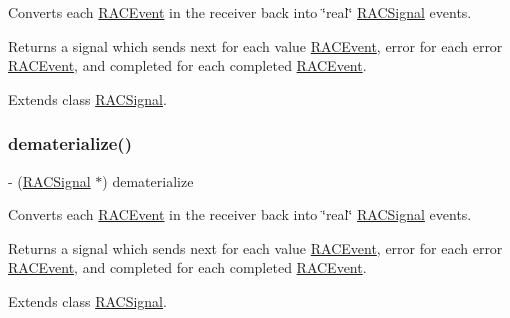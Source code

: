 Converts each \mbox{\hyperlink{interface_r_a_c_event}{R\+A\+C\+Event}} in the receiver back into \char`\"{}real\char`\"{} \mbox{\hyperlink{interface_r_a_c_signal}{R\+A\+C\+Signal}} events.

Returns a signal which sends {\ttfamily next} for each value \mbox{\hyperlink{interface_r_a_c_event}{R\+A\+C\+Event}}, {\ttfamily error} for each error \mbox{\hyperlink{interface_r_a_c_event}{R\+A\+C\+Event}}, and {\ttfamily completed} for each completed \mbox{\hyperlink{interface_r_a_c_event}{R\+A\+C\+Event}}. 

Extends class \mbox{\hyperlink{interface_r_a_c_signal_aa5b197f63d89c698c8cbfc749ea15440}{R\+A\+C\+Signal}}.

\mbox{\label{category_r_a_c_signal_07_operations_08_aa5b197f63d89c698c8cbfc749ea15440}} 
\subsubsection{\texorpdfstring{dematerialize()}{dematerialize()}\hspace{0.1cm}{\footnotesize\ttfamily [3/3]}}
{\footnotesize\ttfamily -\/ (\mbox{\hyperlink{interface_r_a_c_signal}{R\+A\+C\+Signal}} $\ast$) dematerialize \begin{DoxyParamCaption}{ }\end{DoxyParamCaption}}

Converts each \mbox{\hyperlink{interface_r_a_c_event}{R\+A\+C\+Event}} in the receiver back into \char`\"{}real\char`\"{} \mbox{\hyperlink{interface_r_a_c_signal}{R\+A\+C\+Signal}} events.

Returns a signal which sends {\ttfamily next} for each value \mbox{\hyperlink{interface_r_a_c_event}{R\+A\+C\+Event}}, {\ttfamily error} for each error \mbox{\hyperlink{interface_r_a_c_event}{R\+A\+C\+Event}}, and {\ttfamily completed} for each completed \mbox{\hyperlink{interface_r_a_c_event}{R\+A\+C\+Event}}. 

Extends class \mbox{\hyperlink{interface_r_a_c_signal_aa5b197f63d89c698c8cbfc749ea15440}{R\+A\+C\+Signal}}.

\mbox{\label{category_r_a_c_signal_07_operations_08_af88fe4c330bad925ed164ad8f12bdcc8}} 
